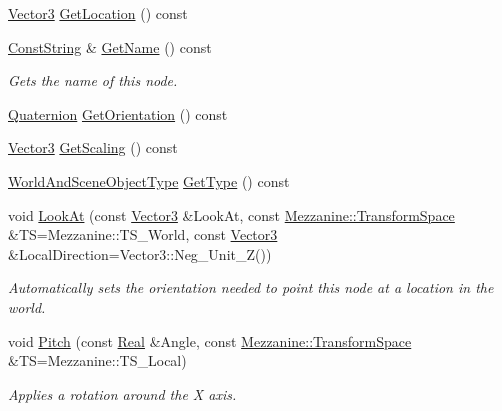 \begin{DoxyCompactItemize}
\hyperlink{classMezzanine_1_1Vector3}{Vector3} \hyperlink{classMezzanine_1_1WorldNode_a7941d8f3347b810d31b511c3b59585f8}{GetLocation} () const 
\item 
\hyperlink{namespaceMezzanine_a63cd699ac54b73953f35ec9cfc05e506}{ConstString} \& \hyperlink{classMezzanine_1_1WorldNode_a9538be39292a297f64d15bf1335ee0cf}{GetName} () const 
\begin{DoxyCompactList}\small\item\em Gets the name of this node. \item\end{DoxyCompactList}\item 
\hyperlink{classMezzanine_1_1Quaternion}{Quaternion} \hyperlink{classMezzanine_1_1WorldNode_ad250735dcbc77c3c96bd4d6b21e43867}{GetOrientation} () const 
\item 
\hyperlink{classMezzanine_1_1Vector3}{Vector3} \hyperlink{classMezzanine_1_1WorldNode_a82be69b653bb3463bec52a114bbb46ef}{GetScaling} () const 
\item 
\hyperlink{namespaceMezzanine_ae8cd04f706f4998be62f454b7119c718}{WorldAndSceneObjectType} \hyperlink{classMezzanine_1_1WorldNode_a604fe6096c4c9b6e3b7614ef4be3d677}{GetType} () const 
\item 
void \hyperlink{classMezzanine_1_1WorldNode_ad9ec8a56450e749cddedef9748594b6d}{LookAt} (const \hyperlink{classMezzanine_1_1Vector3}{Vector3} \&LookAt, const \hyperlink{namespaceMezzanine_ad81c74de3529f1e643bd145173924ed3}{Mezzanine::TransformSpace} \&TS=Mezzanine::TS\_\-World, const \hyperlink{classMezzanine_1_1Vector3}{Vector3} \&LocalDirection=Vector3::Neg\_\-Unit\_\-Z())
\begin{DoxyCompactList}\small\item\em Automatically sets the orientation needed to point this node at a location in the world. \item\end{DoxyCompactList}\item 
void \hyperlink{classMezzanine_1_1WorldNode_a3498ef1f78331824a36a2287b25a5506}{Pitch} (const \hyperlink{namespaceMezzanine_a726731b1a7df72bf3583e4a97282c6f6}{Real} \&Angle, const \hyperlink{namespaceMezzanine_ad81c74de3529f1e643bd145173924ed3}{Mezzanine::TransformSpace} \&TS=Mezzanine::TS\_\-Local)
\begin{DoxyCompactList}\small\item\em Applies a rotation around the X axis. \item\end{DoxyCompactList}\item 

\end{DoxyCompactItemize}

